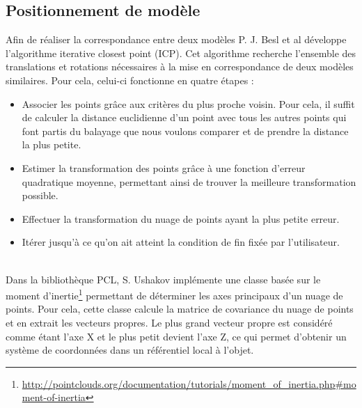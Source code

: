 \subsection{Positionnement de modèle}
Afin de réaliser la correspondance entre deux modèles P. J. Besl et al\cite{ICP} développe l'algorithme \og iterative closest point \fg (ICP).
Cet algorithme recherche l'ensemble des translations et rotations nécessaires à la mise en correspondance de deux modèles similaires. Pour cela,
celui-ci fonctionne en quatre étapes :
\begin{itemize}
  \item Associer les points grâce aux critères du plus proche voisin. Pour cela, il suffit de calculer la distance euclidienne d'un
   point avec tous les autres points qui font partis du balayage que nous voulons comparer et de prendre la distance la plus petite.
  \item Estimer la transformation des points grâce à une fonction d'erreur quadratique moyenne, permettant ainsi de trouver la meilleure
  transformation possible.
  \item Effectuer la transformation du nuage de points ayant la plus petite erreur.
  \item Itérer jusqu'à ce qu'on ait atteint la condition de fin fixée par l'utilisateur.
\end{itemize}
\ \\
Dans la bibliothèque PCL\cite{PCL}, S. Ushakov implémente une classe basée sur le moment d'inertie\footnote{\url{http://pointclouds.org/documentation/tutorials/moment\_of\_inertia.php\#moment-of-inertia}}
permettant de déterminer les axes principaux d'un nuage de points. Pour cela, cette classe calcule la matrice de covariance du nuage de points et 
en extrait les vecteurs propres. Le plus grand vecteur propre est considéré comme étant l'axe X et le plus petit devient l'axe Z, ce qui permet 
d'obtenir un système de coordonnées dans un référentiel local à l'objet.\\   
